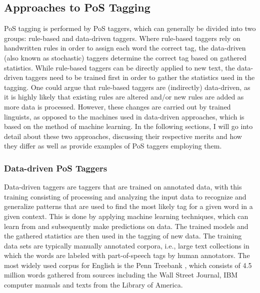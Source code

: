 \documentclass[a4paper,12pt,english]{book}
\begin{document}
\subsection{Approaches to PoS Tagging}
\label{ssec:taggingapproaches}
PoS tagging is performed by PoS taggers, which can generally be divided into
two groups: rule-based and data-driven taggers. Where rule-based taggers rely
on handwritten rules in order to assign each word the correct tag, the
data-driven (also known as stochastic) taggers determine the correct tag based
on gathered statistics.  While rule-based taggers can be directly applied to
new text, the data-driven taggers need to be trained first in order to gather
the statistics used in the tagging. One could argue that rule-based taggers are
(indirectly) data-driven, as it is highly likely that existing rules are
altered and/or new rules are added as more data is processed. However, these
changes are carried out by trained linguists, as opposed to the machines used
in data-driven approaches, which is based on the method of machine learning. In
the following sections, I will go into detail about these two approaches,
discussing their respective merits and how they differ as well as provide
examples of PoS taggers employing them.

\subsubsection{Data-driven PoS Taggers}
\label{sssec:datadriven}
Data-driven taggers are taggers that are trained on annotated data, with this
training consisting of processing and analyzing the input data to recognize and
generalize patterns that are used to find the most likely tag for a given word
in a given context. This is done by applying machine learning techniques, which
can learn from and subsequently make predictions on data. The trained models
and the gathered statistics are then used in the tagging of new data. The
training data sets are typically manually annotated corpora, i.e., large text
collections in which the words are labeled with part-of-speech tags by human
annotators. The most widely used corpus for English is the Penn Treebank
\cite{Mar:San:Mar:93}, which consists of 4.5 million words gathered from
sources including the Wall Street Journal, IBM computer manuals and texts from
the Library of America.
\end{document}
